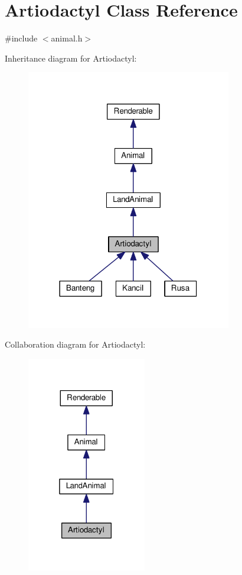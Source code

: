 \hypertarget{classArtiodactyl}{}\section{Artiodactyl Class Reference}
\label{classArtiodactyl}


{\ttfamily \#include $<$animal.\+h$>$}



Inheritance diagram for Artiodactyl\+:
\nopagebreak
\begin{figure}[H]
\begin{center}
\leavevmode
\includegraphics[width=254pt]{classArtiodactyl__inherit__graph}
\end{center}
\end{figure}


Collaboration diagram for Artiodactyl\+:
\nopagebreak
\begin{figure}[H]
\begin{center}
\leavevmode
\includegraphics[width=148pt]{classArtiodactyl__coll__graph}
\end{center}
\end{figure}
